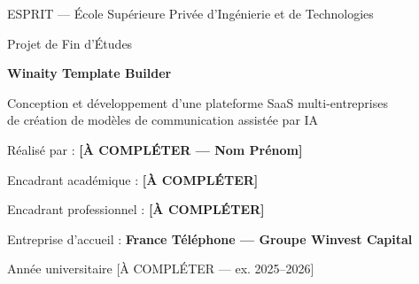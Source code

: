 \documentclass[12pt,a4paper,oneside]{report}
\begin{document}
\begin{titlepage}
  \centering
  \vspace*{1cm}
  {\large ESPRIT — École Supérieure Privée d'Ingénierie et de Technologies\par}
  \vspace{0.5cm}
  {\large Projet de Fin d'Études\par}
  \vspace{2cm}
  {\Huge\bfseries Winaity Template Builder\par}
  \vspace{0.5cm}
  {\Large Conception et développement d'une plateforme SaaS multi-entreprises\\
   de création de modèles de communication assistée par IA\par}
  \vspace{2cm}
  {\large Réalisé par : \textbf{[À COMPLÉTER — Nom Prénom]}\par}
  \vspace{0.3cm}
  {\large Encadrant académique : \textbf{[À COMPLÉTER]}\par}
  {\large Encadrant professionnel : \textbf{[À COMPLÉTER]}\par}
  \vspace{1cm}
  {\large Entreprise d'accueil : \textbf{France Téléphone — Groupe Winvest Capital}\par}
  \vfill
  {\large Année universitaire [À COMPLÉTER — ex. 2025--2026]\par}
\end{titlepage}





\tableofcontents
\listoffigures
\listoftables


\cleardoublepage
{}










\cleardoublepage
{}
\printbibliography[title={Bibliographie / Netographie}]


\end{document}
